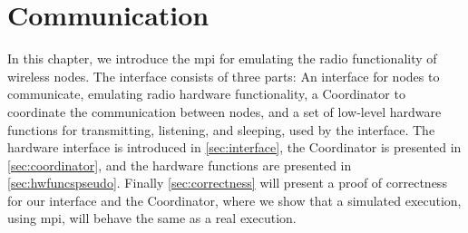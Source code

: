 \chapter{Communication}\label{ch:communication}
In this chapter, we introduce the \acrfull{mpi} for emulating the radio functionality of wireless nodes. The
interface consists of three parts: An interface for nodes to communicate, emulating radio hardware
functionality, a Coordinator to coordinate the communication between nodes, and a set of low-level hardware
functions for transmitting, listening, and sleeping, used by the interface. The hardware interface is
introduced in \autoref{sec:interface}, the Coordinator is presented in \autoref{sec:coordinator}, and the
hardware functions are presented in \autoref{sec:hwfuncspseudo}. Finally \autoref{sec:correctness} will
present a proof of correctness for our interface and the Coordinator, where we show that a simulated
execution, using \gls{mpi}, will behave the same as a real execution. \medbreak




